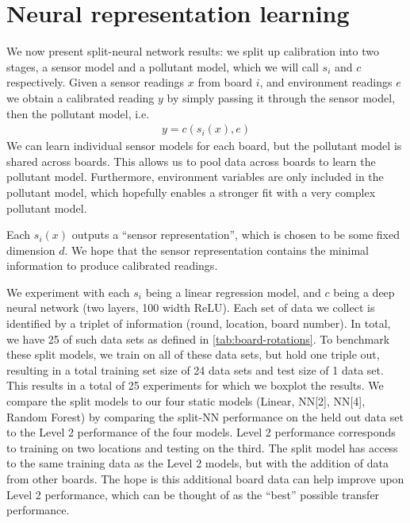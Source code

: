 \documentclass[journal abbreviation, manuscript]{copernicus}
\begin{document}
\section{Neural representation learning}

We now present split-neural network results: we split
up calibration into two stages, a sensor model
and a pollutant model, which we will call $s_i$ and $c$
respectively.
Given a sensor readings $x$ from board $i$,
and environment readings $e$
we obtain a calibrated reading $y$ by simply passing it through
the sensor model, then the pollutant model, i.e.
\begin{align*}
    y = c(s_i(x), e)
\end{align*}
We can learn individual sensor models for each board,
but the pollutant model is shared across boards. This allows
us to pool data across boards to learn the pollutant model.
Furthermore, environment variables are only 
included in the pollutant model, which hopefully enables
a stronger fit with a very complex pollutant model.

Each $s_i(x)$ outputs a ``sensor representation'', which is chosen
to be some fixed dimension $d$. We hope that the sensor representation
contains the minimal information to produce calibrated readings.

We experiment with each $s_i$ being a linear regression model,
and $c$ being a deep neural network (two layers, 100 width ReLU). 
Each set of data we collect
is identified by a triplet of information (round, location, board number). In total, we have 25 of such data sets as defined in \autoref{tab:board-rotations}. To benchmark these split models, we train on all of these data sets, but
hold one triple out, resulting in a
total training set size of 24 data sets and test size of 1 data set. This results in a total of 25 experiments
for which we boxplot the results.
We compare the split models to our four static models (Linear, NN[2], NN[4], Random Forest) by comparing the split-NN performance on the held out data set to the Level 2 performance of the four models.
Level 2 performance corresponds to training on two locations
and testing on the third. The split model has access to the same training data as the Level 2 models, but with the addition of data from other boards. The hope is this additional board data can help improve upon Level 2 performance, which can be thought of as the ``best'' possible transfer performance.
\end{document}
